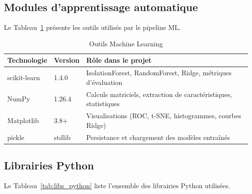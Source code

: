 \subsection{Modules d'apprentissage automatique}

Le Tableau~\ref{tab:stack_ml} présente les outils utilisés par le pipeline ML.

\begin{table}[htbp]
\centering
\renewcommand{\arraystretch}{1.45}
\caption{Outils Machine Learning}
\label{tab:stack_ml}
\begin{tabular}{|p{}|p{}|p{}|}
\hline
\rowcolor{gray!25}
\textbf{Technologie} & \textbf{Version} & \textbf{Rôle dans le projet} \\
\hline
scikit-learn & 1.4.0 & IsolationForest, RandomForest, Ridge, métriques d'évaluation \\
\hline
NumPy & 1.26.4 & Calculs matriciels, extraction de caractéristiques, statistiques \\
\hline
Matplotlib & 3.8+ & Visualisations (ROC, t-SNE, histogrammes, courbes Ridge) \\
\hline
pickle & stdlib & Persistance et chargement des modèles entraînés \\
\hline
\end{tabular}
\end{table}

\subsection{Librairies Python}

Le Tableau~\ref{tab:libs_python} liste l'ensemble des librairies Python utilisées.

